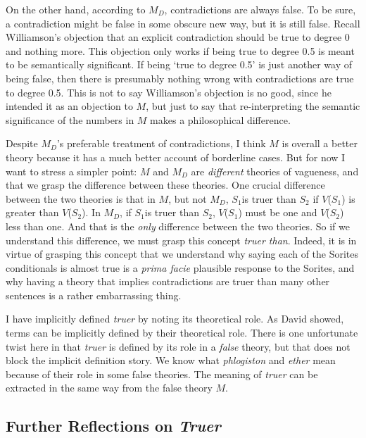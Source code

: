On the other hand, according to \(M_D\), contradictions are always
false. To be sure, a contradiction might be false in some obscure new
way, but it is still false. Recall Williamson's objection that an
explicit contradiction should be true to degree 0 and nothing more. This
objection only works if being true to degree 0.5 is meant to be
semantically significant. If being `true to degree 0.5' is just another
way of being false, then there is presumably nothing wrong with
contradictions are true to degree 0.5. This is not to say Williamson's
objection is no good, since he intended it as an objection to \(M\), but
just to say that re-interpreting the semantic significance of the
numbers in \(M\) makes a philosophical difference.

Despite \(M_D\)'s preferable treatment of contradictions, I think \(M\)
is overall a better theory because it has a much better account of
borderline cases. But for now I want to stress a simpler point: \(M\)
and \(M_D\) are \emph{different} theories of vagueness, and that we
grasp the difference between these theories. One crucial difference
between the two theories is that in \(M\), but not \(M_D\), \(S_1\)is
truer than \(S_2\) if \(V\)(\(S_1\)) is greater than \(V\)(\(S_2\)). In
\(M_D\), if \(S_1\)is truer than \(S_2\), \(V\)(\(S_1\)) must be one and
\(V\)(\(S_2\)) less than one. And that is the \emph{only} difference
between the two theories. So if we understand this difference, we must
grasp this concept \emph{truer than}. Indeed, it is in virtue of
grasping this concept that we understand why saying each of the Sorites
conditionals is almost true is a \emph{prima facie} plausible response
to the Sorites, and why having a theory that implies contradictions are
truer than many other sentences is a rather embarrassing thing.

I have implicitly defined \emph{truer} by noting its theoretical role.
As David \citet{Lewis1972a} showed, terms can be implicitly defined by
their theoretical role. There is one unfortunate twist here in that
\emph{truer} is defined by its role in a \emph{false} theory, but that
does not block the implicit definition story. We know what
\emph{phlogiston} and \emph{ether} mean because of their role in some
false theories. The meaning of \emph{truer} can be extracted in the same
way from the false theory \(M\).

\hypertarget{further-reflections-on-truer}{%
\subsection{\texorpdfstring{Further Reflections on
\emph{Truer}}{Further Reflections on Truer}}\label{further-reflections-on-truer}}

